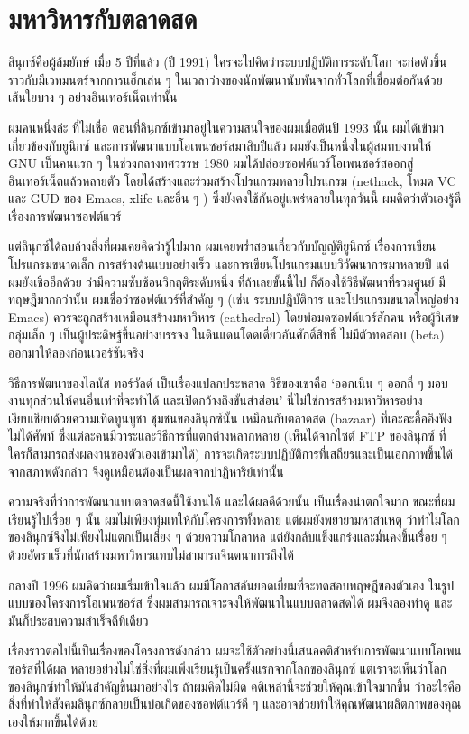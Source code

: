 \chapter{มหาวิหารกับตลาดสด}

ลินุกซ์คือผู้ล้มยักษ์ เมื่อ 5 ปีที่แล้ว (ปี 1991)
ใครจะไปคิดว่าระบบปฏิบัติการระดับโลก
จะก่อตัวขึ้นราวกับมีเวทมนตร์จากการแฮ็กเล่น  ๆ
ในเวลาว่างของนักพัฒนานับพันจากทั่วโลกที่เชื่อมต่อกันด้วยเส้นใยบาง  ๆ
อย่างอินเทอร์เน็ตเท่านั้น

ผมคนหนึ่งล่ะ ที่ไม่เชื่อ
ตอนที่ลินุกซ์เข้ามาอยู่ในความสนใจของผมเมื่อต้นปี 1993 นั้น
ผมได้เข้ามาเกี่ยวข้องกับยูนิกซ์ และการพัฒนาแบบโอเพนซอร์สมาสิบปีแล้ว
ผมยังเป็นหนึ่งในผู้สมทบงานให้ GNU เป็นคนแรก  ๆ   ในช่วงกลางทศวรรษ 1980
ผมได้ปล่อยซอฟต์แวร์โอเพนซอร์สออกสู่อินเทอร์เน็ตแล้วหลายตัว
โดยได้สร้างและร่วมสร้างโปรแกรมหลายโปรแกรม (nethack, โหมด VC และ GUD ของ
Emacs, xlife และอื่น  ๆ  ) ซึ่งยังคงใช้กันอยู่แพร่หลายในทุกวันนี้
ผมคิดว่าตัวเองรู้ดีเรื่องการพัฒนาซอฟต์แวร์

แต่ลินุกซ์ได้ลบล้างสิ่งที่ผมเคยคิดว่ารู้ไปมาก
ผมเคยพร่ำสอนเกี่ยวกับบัญญัติยูนิกซ์ เรื่องการเขียนโปรแกรมขนาดเล็ก
การสร้างต้นแบบอย่างเร็ว และการเขียนโปรแกรมแบบวิวัฒนาการมาหลายปี
แต่ผมยังเชื่ออีกด้วย ว่ามีความซับซ้อนวิกฤติระดับหนึ่ง ที่ถ้าเลยขั้นนี้ไป
ก็ต้องใช้วิธีพัฒนาที่รวมศูนย์ มีทฤษฎีมากกว่านั้น
ผมเชื่อว่าซอฟต์แวร์ที่สำคัญ  ๆ   (เช่น ระบบปฏิบัติการ
และโปรแกรมขนาดใหญ่อย่าง Emacs) ควรจะถูกสร้างเหมือนสร้างมหาวิหาร
(cathedral) โดยพ่อมดซอฟต์แวร์สักคน หรือผู้วิเศษกลุ่มเล็ก  ๆ
เป็นผู้ประดิษฐ์ขึ้นอย่างบรรจง ในดินแดนโดดเดี่ยวอันศักดิ์สิทธิ์
ไม่มีตัวทดสอบ (beta) ออกมาให้ลองก่อนเวอร์ชันจริง

วิธีการพัฒนาของไลนัส ทอร์วัลด์ เป็นเรื่องแปลกประหลาด วิธีของเขาคือ
`ออกเนิ่น  ๆ   ออกถี่  ๆ   มอบงานทุกส่วนให้คนอื่นเท่าที่จะทำได้
และเปิดกว้างถึงขั้นสำส่อน'
นี่ไม่ใช่การสร้างมหาวิหารอย่างเงียบเชียบด้วยความเทิดทูนบูชา
ชุมชนของลินุกซ์นั้น เหมือนกับตลาดสด (bazaar)
ที่เอะอะอื้ออึงฟังไม่ได้ศัพท์
ซึ่งแต่ละคนมีวาระและวิธีการที่แตกต่างหลากหลาย (เห็นได้จากไซต์ FTP
ของลินุกซ์ ที่ใครก็สามารถส่งผลงานของตัวเองเข้ามาได้)
การจะเกิดระบบปฏิบัติการที่เสถียรและเป็นเอกภาพขึ้นได้จากสภาพดังกล่าว
จึงดูเหมือนต้องเป็นผลจากปาฏิหาริย์เท่านั้น

ความจริงที่ว่าการพัฒนาแบบตลาดสดนี้ใช้งานได้ และได้ผลดีด้วยนั้น
เป็นเรื่องน่าตกใจมาก ขณะที่ผมเรียนรู้ไปเรื่อย  ๆ   นั้น
ผมไม่เพียงทุ่มเทให้กับโครงการทั้งหลาย แต่ผมยังพยายามหาสาเหตุ
ว่าทำไมโลกของลินุกซ์จึงไม่เพียงไม่แตกเป็นเสี่ยง  ๆ   ด้วยความโกลาหล
แต่ยังกลับแข็งแกร่งและมั่นคงขึ้นเรื่อย  ๆ
ด้วยอัตราเร็วที่นักสร้างมหาวิหารแทบไม่สามารถจินตนาการถึงได้

กลางปี 1996 ผมคิดว่าผมเริ่มเข้าใจแล้ว
ผมมีโอกาสอันยอดเยี่ยมที่จะทดสอบทฤษฎีของตัวเอง
ในรูปแบบของโครงการโอเพนซอร์ส ซึ่งผมสามารถเจาะจงให้พัฒนาในแบบตลาดสดได้
ผมจึงลองทำดู และมันก็ประสบความสำเร็จดีทีเดียว

เรื่องราวต่อไปนี้เป็นเรื่องของโครงการดังกล่าว
ผมจะใช้ตัวอย่างนี้เสนอคติสำหรับการพัฒนาแบบโอเพนซอร์สที่ได้ผล
หลายอย่างไม่ใช่สิ่งที่ผมเพิ่งเรียนรู้เป็นครั้งแรกจากโลกของลินุกซ์
แต่เราจะเห็นว่าโลกของลินุกซ์ทำให้มันสำคัญขึ้นมาอย่างไร ถ้าผมคิดไม่ผิด
คติเหล่านี้จะช่วยให้คุณเข้าใจมากขึ้น
ว่าอะไรคือสิ่งที่ทำให้สังคมลินุกซ์กลายเป็นบ่อเกิดของซอฟต์แวร์ดี  ๆ
และอาจช่วยทำให้คุณพัฒนาผลิตภาพของคุณเองให้มากขึ้นได้ด้วย